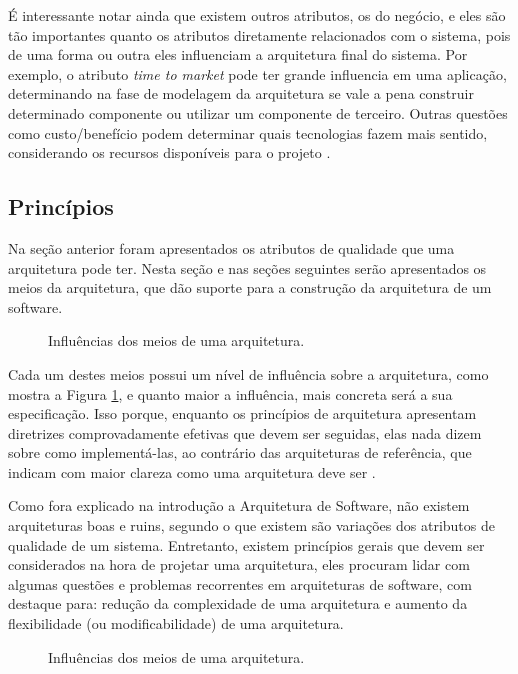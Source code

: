 \documentclass[diss]{template/setrem}
\begin{document}
É interessante notar ainda que existem outros atributos, os do negócio, e eles são tão importantes quanto os atributos diretamente relacionados com o sistema, pois de uma forma ou outra eles influenciam a arquitetura final do sistema. Por exemplo, o atributo \emph{time to market} pode ter grande influencia em uma aplicação, determinando na fase de modelagem da arquitetura se vale a pena construir determinado componente ou utilizar um componente de terceiro. Outras questões como custo/benefício podem determinar quais tecnologias fazem mais sentido, considerando os recursos disponíveis para o projeto \citet{Bass2003}.

\subsection{Princípios}
Na seção anterior foram apresentados os atributos de qualidade que uma arquitetura pode ter. Nesta seção e nas seções seguintes serão apresentados os meios da arquitetura, que dão suporte para a construção da arquitetura de um software.

\begin{figure}[!h]
    \caption{Influências dos meios de uma arquitetura.}
    \label{fig:architecture-means}
\end{figure}

Cada um destes meios possui um nível de influência sobre a arquitetura, como mostra a Figura \ref{fig:architecture-means}, e quanto maior a influência, mais concreta será a sua especificação. Isso porque, enquanto os princípios de arquitetura apresentam diretrizes comprovadamente efetivas que devem ser seguidas, elas nada dizem sobre como implementá-las, ao contrário das arquiteturas de referência, que indicam com maior clareza como uma arquitetura deve ser \citep{Vogel2011}.

Como fora explicado na introdução a Arquitetura de Software, não existem arquiteturas boas e ruins, segundo \citet{Vogel2011} o que existem são variações dos atributos de qualidade de um sistema. Entretanto, existem princípios gerais que devem ser considerados na hora de projetar uma arquitetura, eles procuram lidar com algumas questões e problemas recorrentes em arquiteturas de software, com destaque para: redução da complexidade de uma arquitetura e aumento da flexibilidade (ou modificabilidade) de uma arquitetura.

\begin{figure}[!h]
    \caption{Influências dos meios de uma arquitetura.}
    \label{fig:architecture-principles}
\end{figure}
\end{document}
